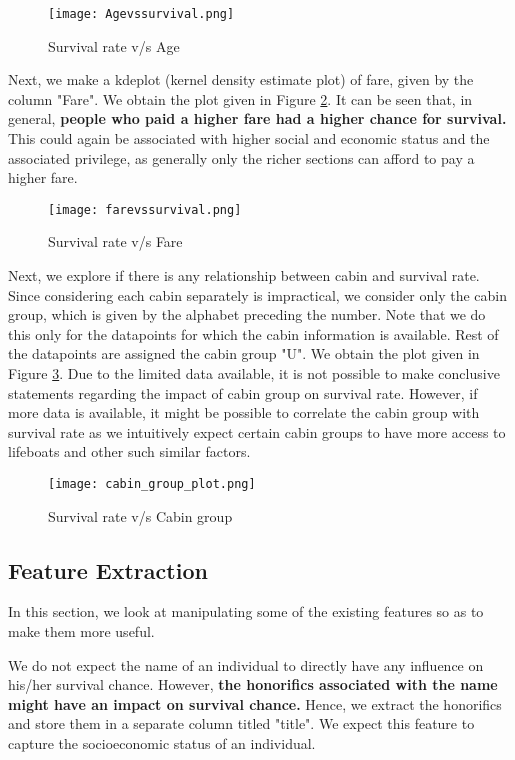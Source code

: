 \documentclass[conference]{IEEEtran}
\begin{document}
\begin{figure}[tbh]
\centering
\texttt{[image: Agevssurvival.png]}
\caption{Survival rate v/s Age}
\label{age_plot}
\end{figure}

Next, we make a kdeplot (kernel density estimate plot) of fare, given by the column "Fare". We obtain the plot given in Figure \ref{farevssurvival}. It can be seen that, in general, \textbf{people who paid a higher fare had a higher chance for survival.} This could again be associated with higher social and economic status and the associated privilege, as generally only the richer sections can afford to pay a higher fare.

\begin{figure}[tbh]
\centering
\texttt{[image: farevssurvival.png]}
\caption{Survival rate v/s Fare}
\label{farevssurvival}
\end{figure}

Next, we explore if there is any relationship between cabin and survival rate. Since considering each cabin separately is impractical, we consider only the cabin group, which is given by the alphabet preceding the number. Note that we do this only for the datapoints for which the cabin information is available. Rest of the datapoints are assigned the cabin group "U". We obtain the plot given in Figure \ref{cabin_group_plot}. Due to the limited data available, it is not possible to make conclusive statements regarding the impact of cabin group on survival rate. However, if more data is available, it might be possible to correlate the cabin group with survival rate as we intuitively expect certain cabin groups to have more access to lifeboats and other such similar factors.

\begin{figure}[tbh]
\centering
\texttt{[image: cabin\_group\_plot.png]}
\caption{Survival rate v/s Cabin group}
\label{cabin_group_plot}
\end{figure}

\subsection{Feature Extraction}

In this section, we look at manipulating some of the existing features so as to make them more useful.

We do not expect the name of an individual to directly have any influence on his/her survival chance. However, \textbf{the honorifics associated with the name might have an impact on survival chance.} Hence, we extract the honorifics and store them in a separate column titled "title". We expect this feature to capture the socioeconomic status of an individual.
\end{document}
